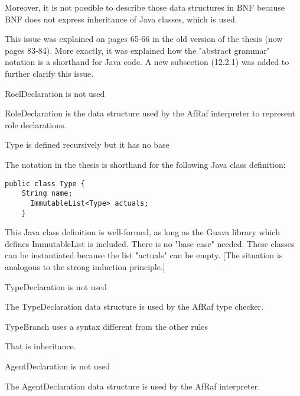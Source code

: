 \documentclass{article}
\newenvironment{them}{\noindent\begingroup\color{blue}}{\endgroup\par}
\begin{document}
Moreover, it is not possible to describe those data structures in BNF because
BNF does not express inheritance of Java classes, which is used.

This issue was explained on pages 65-66 in the old version of the thesis (now
pages 83-84). More exactly, it was explained how the "abstract grammar"
notation is a shorthand for Java code. A new subsection (12.2.1) was added to
further clarify this issue. 

\begin{them}

RoelDeclaration is not used 

\end{them}
RoleDeclaration is the data structure used by the AfRaf interpreter to
represent role declarations.

\begin{them}

Type is defined recursively but it has no base 

\end{them}
The notation in the thesis is shorthand for the following Java class definition:
\begin{verbatim}
public class Type {
    String name;
      ImmutableList<Type> actuals;
    }
\end{verbatim}

This Java class definition is well-formed, as long as the Guava library which
defines ImmutableList is included. There is no "base case" needed. These
classes can be instantiated because the list "actuals" can be empty. [The
situation is analogous to the strong induction principle.]

\begin{them}

TypeDeclaration is not used 

\end{them}
The TypeDeclaration data structure is used by the AfRaf type checker.

\begin{them}

TypeBranch uses a syntax different from the other rules 

\end{them}
That is inheritance. 

\begin{them}

AgentDeclaration is not used 

\end{them}
The AgentDeclaration data structure is used by the AfRaf interpreter.
\end{document}
